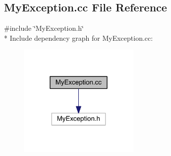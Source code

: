 \hypertarget{a00007}{}\subsection{My\+Exception.\+cc File Reference}
\label{a00007}
{\ttfamily \#include \char`\"{}My\+Exception.\+h\char`\"{}}\\*
Include dependency graph for My\+Exception.\+cc\+:
\nopagebreak
\begin{figure}[H]
\begin{center}
\leavevmode
\includegraphics[width=166pt]{a00017}
\end{center}
\end{figure}
